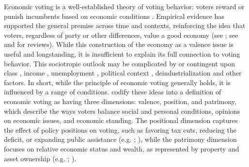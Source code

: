 \documentclass[]{interact}
\theoremstyle{plain}%
\theoremstyle{definition}
\theoremstyle{remark}
\begin{document}
Economic voting is a well-established theory of voting behavior: voters reward or punish incumbents based on economic conditions \citep{campbell_american_1980}. Empirical evidence has supported the general premise across time and contexts, reinforcing the idea that voters, regardless of party or other differences, value a good economy (see \citealt{kiewiet_macroeconomics_1984}; see \citealt{lewis-beck_economic_2007} and \citealt{leighley_economics_2010} for reviews). While this construction of the economy as a valence issue is useful and longstanding, it is insufficient to explain its full connection to voting behavior. This sociotropic outlook may be complicated by or contingent upon class \citep{abramson_change_2010}, income \citep{bartels_unequal_2016}, unemployment \citep{wright_unemployment_2012}, political context \citep{anderson_end_2007}, deindustrialization  \citep{baccini_gone_2021} and other factors. In short, while the principle of economic voting generally holds, it is influenced by a range of conditions. \citet{lewis-beck_economic_2011} codify these ideas into a definition of economic voting as having three dimensions: valence, position, and patrimony, which describe the ways voters balance social and personal conditions, opinions on economic issues, and economic standing. The positional dimension captures the effect of policy positions on voting, such as favoring tax cuts, reducing the deficit, or expanding public assistance  (e.g. \citealt{alvarez_economics_1995}; \citeyear{alvarez_economics_1998}), while the patrimony dimension focuses on relative economic status and wealth, as represented by property and asset ownership (e.g. \citealt{costa_lobo_dimensions_2013}; \citealt{quinlan_patrimonial_2022}). 
\end{document}
